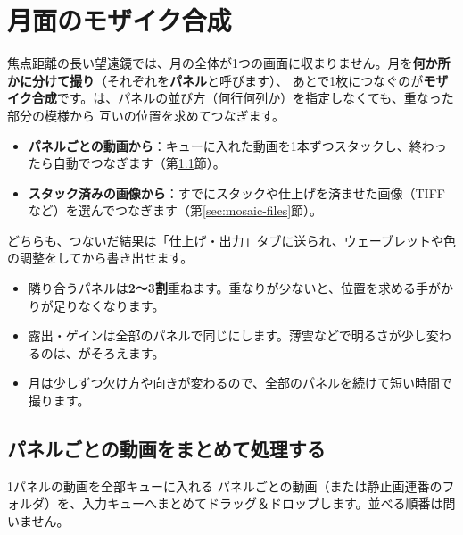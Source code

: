 \chapter{月面のモザイク合成}\label{chap:mosaic}

焦点距離の長い望遠鏡では、月の全体が1つの画面に収まりません。月を\textbf{何か所かに分けて撮り}（それぞれを\textbf{パネル}と呼びます）、
あとで1枚につなぐのが\textbf{モザイク合成}です。\LS は、パネルの並び方（何行何列か）を指定しなくても、重なった部分の模様から
互いの位置を求めてつなぎます。

\begin{point}[2通りの使い方]
  \begin{itemize}[itemsep=1pt, topsep=2pt]
    \item \textbf{パネルごとの動画から}：キューに入れた動画を1本ずつスタックし、終わったら自動でつなぎます（第\ref{sec:mosaic-queue}節）。
    \item \textbf{スタック済みの画像から}：すでにスタックや仕上げを済ませた画像（TIFF など）を選んでつなぎます（第\ref{sec:mosaic-files}節）。
  \end{itemize}
  どちらも、つないだ結果は「仕上げ・出力」タブに送られ、ウェーブレットや色の調整をしてから書き出せます。
\end{point}

\begin{tip}[撮るときのこつ]
  \begin{itemize}[itemsep=1pt, topsep=2pt]
    \item 隣り合うパネルは\textbf{2〜3割}重ねます。重なりが少ないと、位置を求める手がかりが足りなくなります。
    \item 露出・ゲインは全部のパネルで同じにします。薄雲などで明るさが少し変わるのは、\LS がそろえます。
    \item 月は少しずつ欠け方や向きが変わるので、全部のパネルを続けて短い時間で撮ります。
  \end{itemize}
\end{tip}

\section{パネルごとの動画をまとめて処理する}\label{sec:mosaic-queue}

\begin{step}{1}{パネルの動画を全部キューに入れる}
  パネルごとの動画（または静止画連番のフォルダ）を、入力キューへまとめてドラッグ＆ドロップします。並べる順番は問いません。
\end{step}

